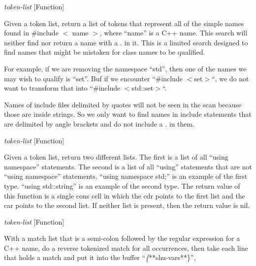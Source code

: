 \vspace{1em}
\noindent
{}
\usebox{\funcname}\emph{token-list}
 \hfill [Function]

\begin{doc-string}
Given a token list, return a list of tokens that represent all of the simple
names found in \#include $<$ name $>$, where ``name'' is a C++ name.  This search
will neither find nor return a name with a . in it.  This is a limited search
designed to find names that might be mistaken for class names to be qualified.

For example, if we are removing the namespace ``std'', then one of the names we
may wish to qualify is ``set''.  Buf if we encounter ``\#include $<$set$>$``, we do
not want to transform that into ``\#include $<$std::set$>$``.

Names of include files delimited by quotes will not be seen in the scan because
those are inside strings.  So we only want to find names in include statements
that are delimited by angle brackets and do not include a . in them.
\end{doc-string}

\vspace{1em}
\noindent
{}
\usebox{\funcname}\emph{token-list}
 \hfill [Function]

\begin{doc-string}
Given a token list, return two different lists.  The first is a list of all
``using namespace'' statements.  The second is a list of all ``using''
statements that are not ``using namespace'' statements.  ``using namespace
std;'' is an example of the first type.  ``using std::string'' is an example of
the second type.
The return value of this function is a single cons cell in which the cdr points
to the first list and the car points to the second list.
If neither list is present, then the return value is nil.
\end{doc-string}

\vspace{1em}
\noindent
{}
\usebox{\funcname}\emph{token-list}
 \hfill [Function]

\begin{doc-string}
With a match list that is a semi-colon followed by the regular expression for
a C++ name, do a reverse tokenized match for all occurrences, then take each line
that holds a match and put it into the buffer ``\emph\{**shu-vars**\}'',
\end{doc-string}

